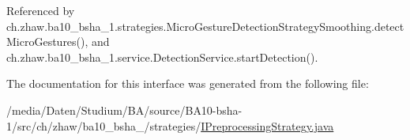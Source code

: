 Referenced by ch.zhaw.ba10\_\-bsha\_\-1.strategies.MicroGestureDetectionStrategySmoothing.detectMicroGestures(), and ch.zhaw.ba10\_\-bsha\_\-1.service.DetectionService.startDetection().

The documentation for this interface was generated from the following file:\begin{DoxyCompactItemize}
\item 
/media/Daten/Studium/BA/source/BA10-\/bsha-\/1/src/ch/zhaw/ba10\_\-bsha\_/strategies/\hyperlink{IPreprocessingStrategy_8java}{IPreprocessingStrategy.java}\end{DoxyCompactItemize}
